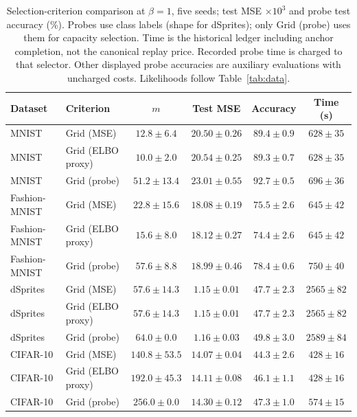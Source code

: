 \begin{table}[H]
\caption{Selection-criterion comparison at $\beta=1$, five seeds; test MSE $\times10^3$ and probe test accuracy (\%). Probes use class labels (shape for dSprites); only Grid (probe) uses them for capacity selection. Time is the historical ledger including anchor completion, not the canonical replay price. Recorded probe time is charged to that selector. Other displayed probe accuracies are auxiliary evaluations with uncharged costs. Likelihoods follow Table~\ref{tab:data}.}\label{tab:selection}
\footnotesize
\setlength{\tabcolsep}{3.5pt}
\begin{tabular*}{\textwidth}{@{\extracolsep{\fill}}llcccc@{}}
\toprule
Dataset & Criterion & $m$ & Test MSE & Accuracy & Time (s) \\
\midrule
MNIST & Grid (MSE) & $12.8 \pm 6.4$ & $20.50 \pm 0.26$ & $89.4 \pm 0.9$ & $628 \pm 35$ \\
MNIST & Grid (ELBO proxy) & $10.0 \pm 2.0$ & $20.54 \pm 0.25$ & $89.3 \pm 0.7$ & $628 \pm 35$ \\
MNIST & Grid (probe) & $51.2 \pm 13.4$ & $23.01 \pm 0.55$ & $92.7 \pm 0.5$ & $696 \pm 36$ \\
Fashion-MNIST & Grid (MSE) & $22.8 \pm 15.6$ & $18.08 \pm 0.19$ & $75.5 \pm 2.6$ & $645 \pm 42$ \\
Fashion-MNIST & Grid (ELBO proxy) & $15.6 \pm 8.0$ & $18.12 \pm 0.27$ & $74.4 \pm 2.6$ & $645 \pm 42$ \\
Fashion-MNIST & Grid (probe) & $57.6 \pm 8.8$ & $18.99 \pm 0.46$ & $78.4 \pm 0.6$ & $750 \pm 40$ \\
dSprites & Grid (MSE) & $57.6 \pm 14.3$ & $1.15 \pm 0.01$ & $47.7 \pm 2.3$ & $2565 \pm 82$ \\
dSprites & Grid (ELBO proxy) & $57.6 \pm 14.3$ & $1.15 \pm 0.01$ & $47.7 \pm 2.3$ & $2565 \pm 82$ \\
dSprites & Grid (probe) & $64.0 \pm 0.0$ & $1.16 \pm 0.03$ & $49.8 \pm 3.0$ & $2589 \pm 84$ \\
CIFAR-10 & Grid (MSE) & $140.8 \pm 53.5$ & $14.07 \pm 0.04$ & $44.3 \pm 2.6$ & $428 \pm 16$ \\
CIFAR-10 & Grid (ELBO proxy) & $192.0 \pm 45.3$ & $14.11 \pm 0.08$ & $46.1 \pm 1.1$ & $428 \pm 16$ \\
CIFAR-10 & Grid (probe) & $256.0 \pm 0.0$ & $14.30 \pm 0.12$ & $47.3 \pm 1.0$ & $574 \pm 15$ \\
\bottomrule
\end{tabular*}
\end{table}
